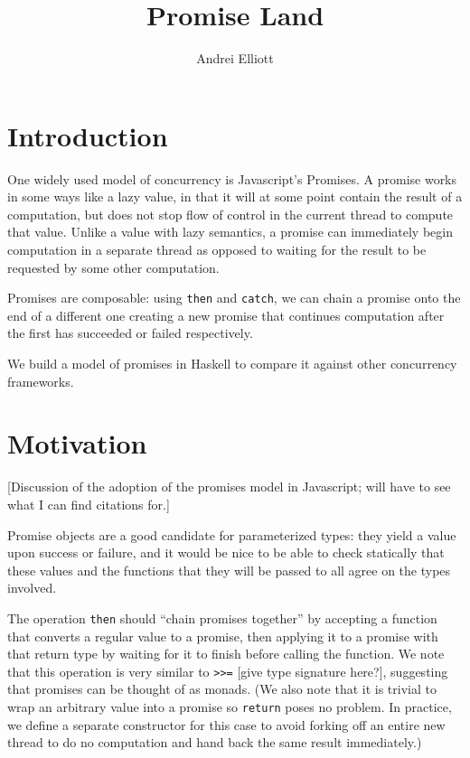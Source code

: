 \documentclass[12pt, english, letterpaper]{kuthesis}
\title{Promise Land}
\author{Andrei Elliott}
\newcommand{\lit}[1]{\texttt{#1}}
\begin{document}
\begin{romanpages}
  \maketitle
\end{romanpages}

\section{Introduction}
One widely used model of concurrency is Javascript's Promises.  A promise works in some ways like a lazy value, in that it will at some point contain the result of a computation, but does not stop flow of control in the current thread to compute that value.  Unlike a value with lazy semantics, a promise can immediately begin computation in a separate thread as opposed to waiting for the result to be requested by some other computation.

Promises are composable: using \lit{then} and \lit{catch}, we can chain a promise onto the end of a different one creating a new promise that continues computation after the first has succeeded or failed respectively.

We build a model of promises in Haskell to compare it against other concurrency frameworks.
\section{Motivation}
[Discussion of the adoption of the promises model in Javascript; will have to see what I can find citations for.]

Promise objects are a good candidate for parameterized types: they yield a value upon success or failure, and it would be nice to be able to check statically that these values and the functions that they will be passed to all agree on the types involved.

The operation \lit{then} should ``chain promises together'' by accepting a function that converts a regular value to a promise, then applying it to a promise with that return type by waiting for it to finish before calling the function.  We note that this operation is very similar to \lit{>>=} [give type signature here?], suggesting that promises can be thought of as monads.  (We also note that it is trivial to wrap an arbitrary value into a promise so \lit{return} poses no problem.  In practice, we define a separate constructor for this case to avoid forking off an entire new thread to do no computation and hand back the same result immediately.)
\end{document}
